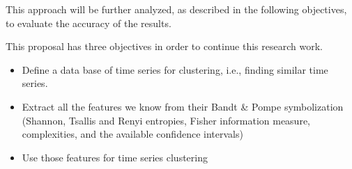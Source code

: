 

This approach will be further analyzed, as described in the following objectives, to evaluate the accuracy of the results.

This proposal has three objectives in order to continue this research work.
\begin{itemize}
	\item Define a data base of time series for clustering, i.e., finding similar time series. 
	\item Extract all the features we know from their Bandt \& Pompe symbolization (Shannon, Tsallis and Renyi entropies, Fisher information measure, complexities, and the available confidence intervals)
	\item Use those features for time series clustering 
\end{itemize} 

